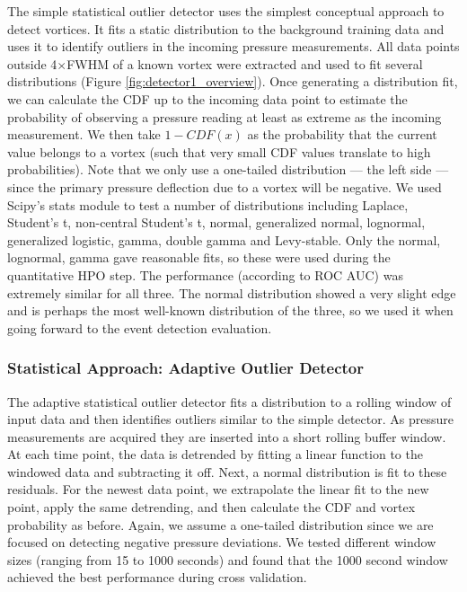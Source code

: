 The simple statistical outlier detector uses the simplest conceptual approach to detect vortices. 
It fits a static distribution to the background training data and uses it to identify outliers in the incoming pressure measurements. 
All data points outside 4$\times$\acrshort{FWHM} of a known vortex were extracted and used to fit several distributions (Figure \ref{fig:detector1_overview}). 
Once generating a distribution fit, we can calculate the \acrfull{CDF} up to the incoming data point to estimate the probability of observing a pressure reading at least as extreme as the incoming measurement. 
We then take $1-CDF(x)$ as the probability that the current value belongs to a vortex (such that very small \acrshort{CDF} values translate to high probabilities).
Note that we only use a one-tailed distribution — the left side — since the primary pressure deflection due to a vortex will be negative. 
We used Scipy’s stats module to test a number of distributions including Laplace, Student’s t, non-central Student's t, normal, generalized normal, lognormal, generalized logistic, gamma, double gamma and Levy-stable. 
Only the normal, lognormal, gamma gave reasonable fits, so these were used during the quantitative \acrshort{HPO} step. 
The performance (according to \acrshort{ROC AUC}) was extremely similar for all three. 
The normal distribution showed a very slight edge and is perhaps the most well-known distribution of the three, so we used it when going forward to the event detection evaluation. 

\subsubsection{Statistical Approach: Adaptive Outlier Detector}

The adaptive statistical outlier detector fits a distribution to a rolling window of input data and then identifies outliers similar to the simple detector. 
As pressure measurements are acquired they are inserted into a short rolling buffer window. 
At each time point, the data is detrended by fitting a linear function to the windowed data and subtracting it off. 
Next, a normal distribution is fit to these residuals. 
For the newest data point, we extrapolate the linear fit to the new point, apply the same detrending, and then calculate the \acrshort{CDF} and vortex probability as before.
Again, we assume a one-tailed distribution since we are focused on detecting negative pressure deviations. 
We tested different window sizes (ranging from 15 to 1000 seconds) and found that the 1000 second window achieved the best performance during cross validation.

